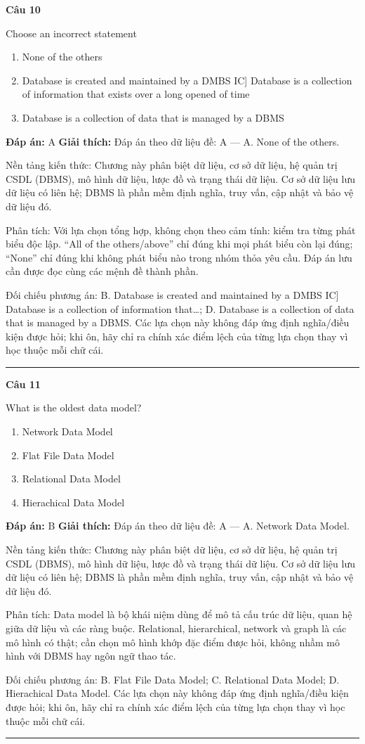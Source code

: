 \documentclass[11pt,a4paper]{article}
\newenvironment{question}[1]{%
  \par\vspace{1em}\noindent\textbf{\large Câu #1}\par\vspace{0.4em}
}{%
  \par\vspace{1em}\hrule\vspace{0.6em}
}
\newenvironment{choices}{%
  \begin{enumerate}[label=\textbf{\Alph*.},leftmargin=2.2em,itemsep=2pt,topsep=3pt]
}{%
  \end{enumerate}
}
\newcommand{\choice}{\item}
\begin{document}
\begin{question}{10}
Choose an incorrect statement
\begin{choices}
\choice None of the others
\choice Database is created and maintained by a DMBS
IC]
Database is a collection of information that exists over a long opened of time
\choice Database is a collection of data that is managed by a DBMS
\end{choices}
\textbf{Đáp án:} A
\textbf{Giải thích:} Đáp án theo dữ liệu đề: A — A. None of the others.

Nền tảng kiến thức: Chương này phân biệt dữ liệu, cơ sở dữ liệu, hệ quản trị CSDL (DBMS), mô hình dữ liệu, lược đồ và trạng thái dữ liệu. Cơ sở dữ liệu lưu dữ liệu có liên hệ; DBMS là phần mềm định nghĩa, truy vấn, cập nhật và bảo vệ dữ liệu đó.

Phân tích: Với lựa chọn tổng hợp, không chọn theo cảm tính: kiểm tra từng phát biểu độc lập. “All of the others/above” chỉ đúng khi mọi phát biểu còn lại đúng; “None” chỉ đúng khi không phát biểu nào trong nhóm thỏa yêu cầu. Đáp án lưu cần được đọc cùng các mệnh đề thành phần.

Đối chiếu phương án: B. Database is created and maintained by a DMBS IC] Database is a collection of information that…; D. Database is a collection of data that is managed by a DBMS. Các lựa chọn này không đáp ứng định nghĩa/điều kiện được hỏi; khi ôn, hãy chỉ ra chính xác điểm lệch của từng lựa chọn thay vì học thuộc mỗi chữ cái.
\end{question}

\begin{question}{11}
What is the oldest data model?
\begin{choices}
\choice Network Data Model
\choice Flat File Data Model
\choice Relational Data Model
\choice Hierachical Data Model
\end{choices}
\textbf{Đáp án:} B
\textbf{Giải thích:} Đáp án theo dữ liệu đề: A — A. Network Data Model.

Nền tảng kiến thức: Chương này phân biệt dữ liệu, cơ sở dữ liệu, hệ quản trị CSDL (DBMS), mô hình dữ liệu, lược đồ và trạng thái dữ liệu. Cơ sở dữ liệu lưu dữ liệu có liên hệ; DBMS là phần mềm định nghĩa, truy vấn, cập nhật và bảo vệ dữ liệu đó.

Phân tích: Data model là bộ khái niệm dùng để mô tả cấu trúc dữ liệu, quan hệ giữa dữ liệu và các ràng buộc. Relational, hierarchical, network và graph là các mô hình có thật; cần chọn mô hình khớp đặc điểm được hỏi, không nhầm mô hình với DBMS hay ngôn ngữ thao tác.

Đối chiếu phương án: B. Flat File Data Model; C. Relational Data Model; D. Hierachical Data Model. Các lựa chọn này không đáp ứng định nghĩa/điều kiện được hỏi; khi ôn, hãy chỉ ra chính xác điểm lệch của từng lựa chọn thay vì học thuộc mỗi chữ cái.
\end{question}
\end{document}

